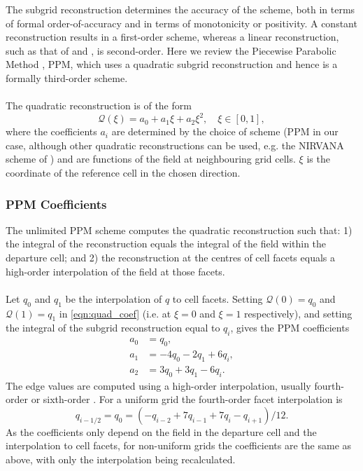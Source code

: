 \documentclass[11pt,a4paper]{article}
\begin{document}
The subgrid reconstruction determines the accuracy of the scheme, both in terms of formal order-of-accuracy and in terms of monotonicity or positivity. A constant reconstruction results in a first-order scheme, whereas a linear reconstruction, such as that of \citet{fromm1968method} and \citet{van1974towards}, is second-order. Here we review the Piecewise Parabolic Method \citep{colella1984ppm}, PPM, which uses a quadratic subgrid reconstruction and hence is a formally third-order scheme. \\
\\
The quadratic reconstruction is of the form
\begin{equation} \label{eqn:quad_coef}
    \mathcal{Q}(\xi) = a_0 + a_1 \xi + a_2 \xi^2, \quad \xi \in [0, 1],
\end{equation}
where the coefficients $a_i$ are determined by the choice of scheme (PPM in our case, although other quadratic reconstructions can be used, e.g. the NIRVANA scheme of \cite{leonard1995nirvana}) and are functions of the field at neighbouring grid cells. $\xi$ is the coordinate of the reference cell in the chosen direction. 

\subsubsection{PPM Coefficients} \label{sec:ppm_recon}

The unlimited PPM scheme \citep{colella1984ppm} computes the quadratic reconstruction such that: 1) the integral of the reconstruction equals the integral of the field within the departure cell; and 2) the reconstruction at the centres of cell facets equals a high-order interpolation of the field at those facets. \\
\\
Let $q_0$ and $q_1$ be the interpolation of $q$ to cell facets. Setting $\mathcal{Q}(0)=q_0$ and $\mathcal{Q}(1) = q_1$ in \eqref{eqn:quad_coef} (i.e. at $\xi=0$ and $\xi=1$ respectively), and setting the integral of the subgrid reconstruction equal to $q_i$, gives the PPM coefficients
\begin{subequations}
\begin{align}
    a_0 &= q_0, \\
    a_1 &= -4 q_0 - 2 q_1 + 6 q_i, \\
    a_2 &= 3 q_0 + 3 q_1 - 6 q_i.
\end{align}
\end{subequations}
The edge values are computed using a high-order interpolation, usually fourth-order \citep{colella1984ppm} or sixth-order \citep{colella2008}.
For a uniform grid the fourth-order facet interpolation is
\begin{equation}
    q_{i-1/2} = q_0 = \left( -q_{i-2} + 7 q_{i-1} + 7 q_{i} - q_{i+1}\right)/12.
\end{equation}
As the coefficients only depend on the field in the departure cell and the interpolation to cell facets, for non-uniform grids the coefficients are the same as above, with only the interpolation being recalculated.  
\end{document}
